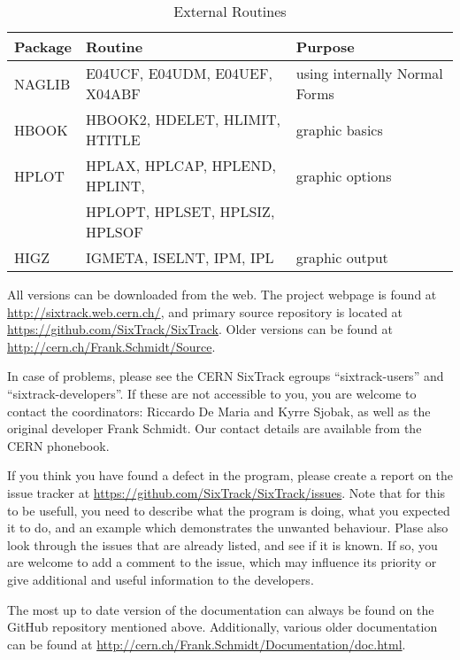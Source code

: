 \begin{table}[h]
\caption{External Routines}
\label{T-ExtRou}
\scriptsize \centering
\begin{tabular}{|l|l|l|}
    \hline \rule[-3.75mm]{0mm}{10mm}
    {\bf\large Package} & {\bf\large Routine} & {\bf\large Purpose} \\
    \hline \rule[-3.75mm]{0mm}{10mm} NAGLIB & E04UCF, E04UDM, E04UEF, X04ABF & using internally Normal Forms \\
    \hline \rule[-3.75mm]{0mm}{10mm} HBOOK  & HBOOK2, HDELET, HLIMIT, HTITLE & graphic basics \\
    \hline \rule[-3.75mm]{0mm}{10mm} HPLOT  & HPLAX,  HPLCAP, HPLEND, HPLINT, & graphic options \\
    \cline{2-2} \rule[-3.75mm]{0mm}{10mm}   & HPLOPT, HPLSET, HPLSIZ, HPLSOF &  \\
    \hline \rule[-3.75mm]{0mm}{10mm} HIGZ   & IGMETA, ISELNT, IPM, IPL       & graphic output \\
    \hline
\end{tabular}
\normalsize
\end{table}

All versions can be downloaded from the web.
The project webpage is found at \url{http://sixtrack.web.cern.ch/},
  and primary source repository is located at \url{https://github.com/SixTrack/SixTrack}.
Older versions can be found at \url{http://cern.ch/Frank.Schmidt/Source}.

In case of problems, please see the CERN SixTrack egroups ``sixtrack-users'' and ``sixtrack-developers''.
If these are not accessible to you, you are welcome to contact the coordinators: Riccardo De Maria and Kyrre Sjobak, as well as the original developer Frank Schmidt.
Our contact details are available from the CERN phonebook.

If you think you have found a defect in the program, please create a report on the issue tracker at \url{https://github.com/SixTrack/SixTrack/issues}.
Note that for this to be usefull, you need to describe what the program is doing, what you expected it to do, and an example which demonstrates the unwanted behaviour.
Plase also look through the issues that are already listed, and see if it is known.
If so, you are welcome to add a comment to the issue, which may influence its priority or give additional and useful information to the developers.

The most up to date version of the documentation can always be found on the GitHub repository mentioned above.
Additionally, various older documentation can be found at \url{http://cern.ch/Frank.Schmidt/Documentation/doc.html}.

